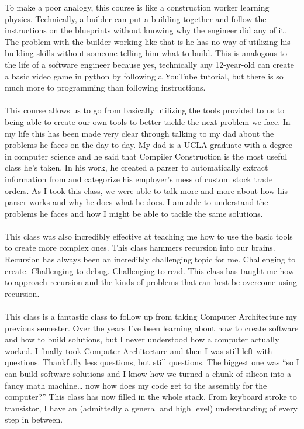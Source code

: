 \documentclass{article}
\theoremstyle{theorem}
\theoremstyle{definition}
\theoremstyle{remark}
\begin{document}
To make a poor analogy, this course is like a construction worker learning physics. Technically, a builder can put a building together and follow the instructions on the blueprints without knowing why the engineer did any of it. The problem with the builder working like that is he has no way of utilizing his building skills without someone telling him what to build. This is analogous to the life of a software engineer because yes, technically any 12-year-old can create a basic video game in python by following a YouTube tutorial, but there is so much more to programming than following instructions. 
\\\\
This course allows us to go from basically utilizing the tools provided to us to being able to create our own tools to better tackle the next problem we face. In my life this has been made very clear through talking to my dad about the problems he faces on the day to day. My dad is a UCLA graduate with a degree in computer science and he said that Compiler Construction is the most useful class he’s taken. In his work, he created a parser to automatically extract information from and categorize his employer’s mess of custom stock trade orders. As I took this class, we were able to talk more and more about how his parser works and why he does what he does. I am able to understand the problems he faces and how I might be able to tackle the same solutions. 
\\\\
This class was also incredibly effective at teaching me how to use the basic tools to create more complex ones. This class hammers recursion into our brains. Recursion has always been an incredibly challenging topic for me. Challenging to create. Challenging to debug. Challenging to read. This class has taught me how to approach recursion and the kinds of problems that can best be overcome using recursion. 
\\\\
This class is a fantastic class to follow up from taking Computer Architecture my previous semester. Over the years I’ve been learning about how to create software and how to build solutions, but I never understood how a computer actually worked. I finally took Computer Architecture and then I was still left with questions. Thankfully less questions, but still questions. The biggest one was “so I can build software solutions and I know how we turned a chunk of silicon into a fancy math machine… now how does my code get to the assembly for the computer?” This class has now filled in the whole stack. From keyboard stroke to transistor, I have an (admittedly a general and high level) understanding of every step in between. 
\end{document}
